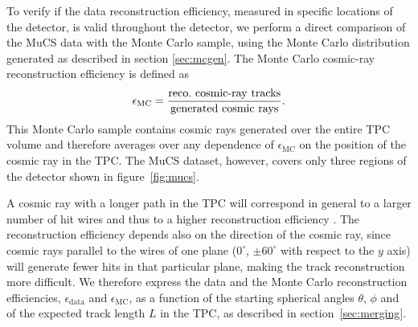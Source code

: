 \documentclass[a4paper,11pt]{article}
\def\myhyphen{{\hbox{-}}}
\begin{document}

To verify if the data reconstruction efficiency, measured in specific locations of the detector, is valid throughout the detector, we perform a direct comparison of the MuCS data with the Monte Carlo sample, using the Monte Carlo distribution generated as described in section \ref{sec:mcgen}.
The Monte Carlo cosmic-ray reconstruction efficiency is defined as
\begin{equation}
  \epsilon_{\mathrm{MC}} = \frac{\mathrm{reco.~cosmic\myhyphen ray~tracks}}{\mathrm{generated~cosmic~rays}}.
\end{equation}
This Monte Carlo sample contains cosmic rays generated over the entire TPC volume and therefore averages over any dependence of $\epsilon_{\mathrm{MC}}$ on the position of the cosmic ray in the TPC. The MuCS dataset, however, covers only three regions of the detector shown in figure~\ref{fig:mucs}. %

A cosmic ray with a longer path in the TPC will correspond in general to a larger number of hit wires and thus to a higher reconstruction efficiency \cite{pandora2}. The reconstruction efficiency depends also on the direction of the cosmic ray, since cosmic rays parallel to the wires of one plane ($0^{\circ}$, $\pm60^{\circ}$ with respect to the $y$ axis) will generate fewer hits in that particular plane, making the track reconstruction more difficult.
We therefore express the data and the Monte Carlo reconstruction efficiencies, $\epsilon_{\mathrm{data}}$ and $\epsilon_{\mathrm{MC}}$, as a function of the starting spherical angles $\theta$, $\phi$ and of the expected track length $L$ in the TPC, as described in section~\ref{sec:merging}.
\end{document}
